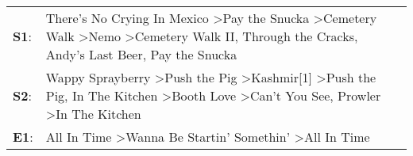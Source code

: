 \begin{supertabular}{p{0.03\textwidth}p{0.92\textwidth}}
 \textbf{S1}:  &                                         There's No Crying In Mexico\textsuperscript{} \textgreater \enspace Pay the Snucka\textsuperscript{} \textgreater \enspace Cemetery Walk\textsuperscript{} \textgreater \enspace Nemo\textsuperscript{} \textgreater \enspace Cemetery Walk II\textsuperscript{}, \enspace Through the Cracks\textsuperscript{}, \enspace Andy's Last Beer\textsuperscript{}, \enspace Pay the Snucka\textsuperscript{}  \enspace  \\
 \textbf{S2}:  &  Wappy Sprayberry\textsuperscript{} \textgreater \enspace Push the Pig\textsuperscript{} \textgreater \enspace Kashmir[1]\textsuperscript{} \textgreater \enspace Push the Pig\textsuperscript{}, \enspace In The Kitchen\textsuperscript{} \textgreater \enspace Booth Love\textsuperscript{} \textgreater \enspace Can't You See\textsuperscript{}, \enspace Prowler\textsuperscript{} \textgreater \enspace In The Kitchen\textsuperscript{}  \enspace  \\
 \textbf{E1}:  &                                                                                                                                                                                                                                                                                           All In Time\textsuperscript{} \textgreater \enspace Wanna Be Startin' Somethin'\textsuperscript{} \textgreater \enspace All In Time\textsuperscript{}  \enspace  \\
\end{supertabular}
